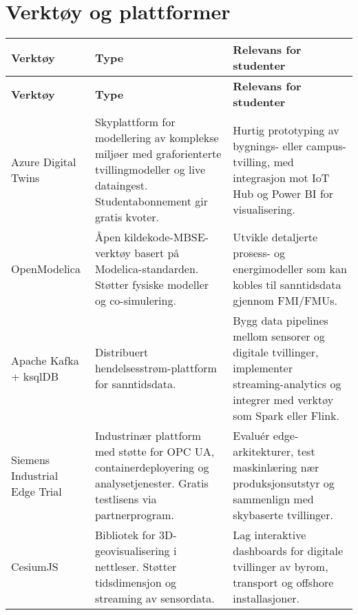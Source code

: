 \section{Verktøy og plattformer}
\begin{longtable}{p{}p{}p{}}
\toprule
\textbf{Verktøy} & \textbf{Type} & \textbf{Relevans for studenter} \\
\midrule
\endfirsthead
\toprule
\textbf{Verktøy} & \textbf{Type} & \textbf{Relevans for studenter} \\
\midrule
\endhead
Azure Digital Twins & Skyplattform for modellering av komplekse miljøer med graforienterte tvillingmodeller og live dataingest. Studentabonnement gir gratis kvoter. & Hurtig prototyping av bygnings- eller campus-tvilling, med integrasjon mot IoT Hub og Power BI for visualisering. \\
\addlinespace
OpenModelica & Åpen kildekode-MBSE-verktøy basert på Modelica-standarden. Støtter fysiske modeller og co-simulering. & Utvikle detaljerte prosess- og energimodeller som kan kobles til sanntidsdata gjennom FMI/FMUs. \\
\addlinespace
Apache Kafka + ksqlDB & Distribuert hendelsesstrøm-plattform for sanntidsdata. & Bygg data pipelines mellom sensorer og digitale tvillinger, implementer streaming-analytics og integrer med verktøy som Spark eller Flink. \\
\addlinespace
Siemens Industrial Edge Trial & Industrinær plattform med støtte for OPC UA, containerdeployering og analysetjenester. Gratis testlisens via partnerprogram. & Evaluér edge-arkitekturer, test maskinlæring nær produksjonsutstyr og sammenlign med skybaserte tvillinger. \\
\addlinespace
CesiumJS & Bibliotek for 3D-geovisualisering i nettleser. Støtter tidsdimensjon og streaming av sensordata. & Lag interaktive dashboards for digitale tvillinger av byrom, transport og offshore installasjoner. \\
\bottomrule
\end{longtable}

